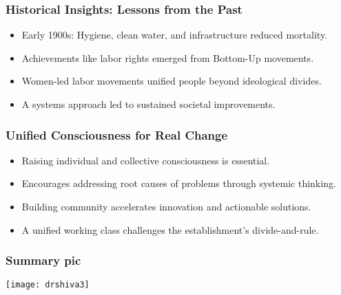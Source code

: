 \begin{frame}[fragile]\frametitle{Historical Insights: Lessons from the Past}
      \begin{itemize}
        \item Early 1900s: Hygiene, clean water, and infrastructure reduced mortality.
        \item Achievements like labor rights emerged from Bottom-Up movements.
        \item Women-led labor movements unified people beyond ideological divides.
        \item A systems approach led to sustained societal improvements.
      \end{itemize}
\end{frame}

\begin{frame}[fragile]\frametitle{Unified Consciousness for Real Change}
      \begin{itemize}
        \item Raising individual and collective consciousness is essential.
        \item Encourages addressing root causes of problems through systemic thinking.
        \item Building community accelerates innovation and actionable solutions.
        \item A unified working class challenges the establishment's divide-and-rule.
      \end{itemize}
\end{frame}


\begin{frame}[fragile]\frametitle{Summary pic}

\begin{center}
\texttt{[image: drshiva3]}
\end{center}	  
\end{frame}